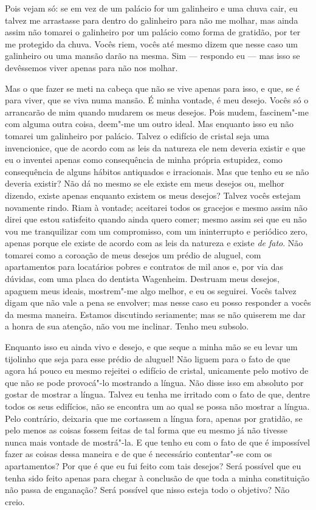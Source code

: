 Pois vejam só: se em vez de um palácio for um galinheiro e uma chuva
cair, eu talvez me arrastasse para dentro do galinheiro para não me
molhar, mas ainda assim não tomarei o galinheiro por um palácio como
forma de gratidão, por ter me protegido da chuva. Vocês riem, vocês até
mesmo dizem que nesse caso um galinheiro ou uma mansão darão na mesma.
Sim --- respondo eu --- mas isso se devêssemos viver apenas para não nos
molhar.

Mas o que fazer se meti na cabeça que não se vive apenas para isso, e
que, se é para viver, que se viva numa mansão. É minha vontade, é meu
desejo. Vocês só o arrancarão de mim quando mudarem os meus desejos.
Pois mudem, fascinem"-me com alguma outra coisa, deem"-me um outro ideal.
Mas enquanto isso eu não tomarei um galinheiro por palácio. Talvez o
edifício de cristal seja uma invencionice, que de acordo com as leis da
natureza ele nem deveria existir e que eu o inventei apenas como
consequência de minha própria estupidez, como consequência de alguns
hábitos antiquados e irracionais. Mas que tenho eu se não deveria
existir? Não dá no mesmo se ele existe em meus desejos ou, melhor
dizendo, existe apenas enquanto existem os meus desejos? Talvez vocês
estejam novamente rindo. Riam à vontade; aceitarei todos os gracejos e
mesmo assim não direi que estou satisfeito quando ainda quero comer;
mesmo assim sei que eu não vou me tranquilizar com um compromisso, com
um ininterrupto e periódico zero, apenas porque ele existe de acordo
com as leis da natureza e existe \textit{de fato}.
Não tomarei como a coroação de meus desejos um prédio de aluguel, com
apartamentos para locatários pobres e contratos de mil anos e, por via
das dúvidas, com uma placa do dentista Wagenheim. Destruam meus
desejos, apaguem meus ideais, mostrem"-me algo melhor, e eu os seguirei.
Vocês talvez digam que não vale a pena se envolver; mas nesse caso eu
posso responder a vocês da mesma maneira. Estamos discutindo
seriamente; mas se não quiserem me dar a honra de sua atenção, não vou
me inclinar. Tenho meu subsolo.

Enquanto isso eu ainda vivo e desejo, e que seque a minha mão se eu
levar um tijolinho que seja para esse prédio de aluguel! Não liguem
para o fato de que agora há pouco eu mesmo rejeitei o edifício de
cristal, unicamente pelo motivo de que não se pode provocá"-lo mostrando
a língua. Não disse isso em absoluto por gostar de mostrar a língua.
Talvez eu tenha me irritado com o fato de que, dentre todos os seus
edifícios, não se encontra um ao qual se possa não mostrar a língua.
Pelo contrário, deixaria que me cortassem a língua fora, apenas por
gratidão, se pelo menos as coisas fossem feitas de tal forma que eu
mesmo já não tivesse nunca mais vontade de mostrá"-la. E que tenho eu
com o fato de que é impossível fazer as coisas dessa maneira e de que é
necessário contentar"-se com os apartamentos? Por que é que eu fui feito
com tais desejos? Será possível que eu tenha sido feito apenas para
chegar à conclusão de que toda a minha constituição não passa de
enganação? Será possível que nisso esteja todo o objetivo? Não creio.

